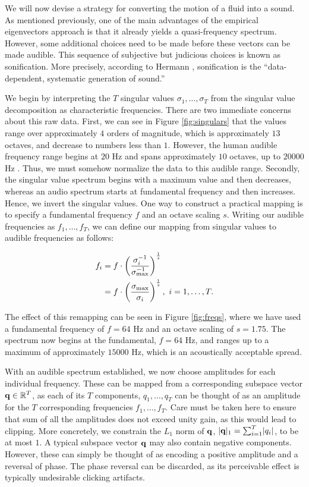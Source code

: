 We will now devise a strategy for converting the motion of a fluid into a sound. As mentioned previously, one of the main advantages of the empirical eigenvectors approach is that it already yields a quasi-frequency spectrum. However, some additional choices need to be made before these vectors can be made audible. This sequence of subjective but judicious choices is known as sonification. More precisely, according to Hermann \cite{hermann2008}, sonification is the ``data-dependent, systematic generation of sound.''

We begin by interpreting the $T$ singular values $\sigma_1, \ldots, \sigma_T$ from the singular value decomposition as characteristic frequencies. There are two immediate concerns about this raw data. First, we can see in Figure \ref{fig:singulars} that the values range over approximately $4$ orders of magnitude, which is approximately $13$ octaves, and decrease to numbers less than $1$. However, the human audible frequency range begins at $20$ Hz and spans approximately $10$ octaves, up to $20000$ Hz \cite{rosen2011signals}. Thus, we must somehow normalize the data to this audible range. Secondly, the singular value spectrum begins with a maximum value and then decreases, whereas an audio spectrum starts at fundamental frequency and then increases. Hence, we invert the singular values. One way to construct a practical mapping is to specify a fundamental frequency $f$ and an octave scaling $s$. Writing our audible frequencies as $f_1, \ldots, f_T$, we can define our mapping from singular values to audible frequencies as follows:

\begin{equation} 
\begin{aligned}
f_i &= f \cdot \left(\frac{\sigma_{i}^{-1}}{\sigma_{\textnormal{max}}^{-1}}\right)^{\frac{1}{s}} \\
&= f \cdot \left(\frac{\sigma_{\textnormal{max}}}{\sigma_i}\right)^{\frac{1}{s}}, \ i = 1, \ldots, T.
\end{aligned}
\end{equation}

The effect of this remapping can be seen in Figure \ref{fig:freqs}, where we have used a fundamental frequency of $f = 64$ Hz and an octave scaling of $s = 1.75$. The spectrum now begins at the fundamental, $f = 64$ Hz, and ranges up to a maximum of approximately $15000$ Hz, which is an acoustically acceptable spread.

With an audible spectrum established, we now choose amplitudes for each individual frequency. These can be mapped from a corresponding subspace vector $\mathbf{q} \in \mathbb{R}^T$, as each of its $T$ components, $q_1, \ldots, q_T$ can be thought of as an amplitude for the $T$ corresponding frequencies $f_1, \ldots, f_T$. Care must be taken here to ensure that sum of all the amplitudes does not exceed unity gain, as this would lead to clipping. More concretely, we constrain the $L_1$ norm of $\mathbf{q}$, $\lvert\mathbf{q}\rvert_1 = \sum_{i=1}^{T}\lvert q_i \rvert$, to be at most $1$. A typical subspace vector $\mathbf{q}$ may also contain negative components. However, these can simply be thought of as encoding a positive amplitude and a reversal of phase. The phase reversal can be discarded, as its perceivable effect is typically undesirable clicking artifacts.

